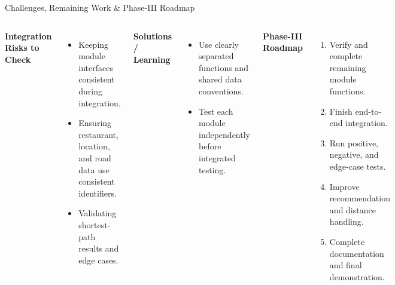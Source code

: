 \documentclass[aspectratio=169,10pt]{beamer}
\begin{document}
\begin{frame}{Challenges, Remaining Work \& Phase-III Roadmap}
\begin{columns}[T,totalwidth=\textwidth]
\textbf{\color{GEUBlue}Integration Risks to Check}
\begin{itemize}\itemsep3pt
\item Keeping module interfaces consistent during integration.
\item Ensuring restaurant, location, and road data use consistent identifiers.
\item Validating shortest-path results and edge cases.
\end{itemize}
\vspace{2mm}
\textbf{\color{GEUBlue}Solutions / Learning}
\begin{itemize}\itemsep3pt
\item Use clearly separated functions and shared data conventions.
\item Test each module independently before integrated testing.
\end{itemize}
\textbf{\color{GEUBlue}Phase-III Roadmap}
\begin{enumerate}\itemsep4pt
\item Verify and complete remaining module functions.
\item Finish end-to-end integration.
\item Run positive, negative, and edge-case tests.
\item Improve recommendation and distance handling.
\item Complete documentation and final demonstration.
\end{enumerate}
\end{columns}

\end{frame}
\end{document}
